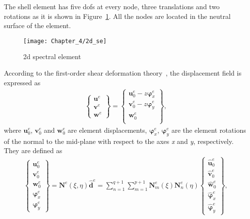 \documentclass[11pt,a4paper,final]{report}
\theoremstyle{plain}
\begin{document}
The shell element has five \acp{dof} at every node, three translations and two rotations as it is shown in Figure~\ref{fig:2d_se}.
All the nodes are located in the neutral surface of the element.
\begin{figure}
	\begin{center}
		\texttt{[image: Chapter\_4/2d\_se]}
	\end{center}
	\caption{\Acl{2d} spectral element}
	\label{fig:2d_se}
\end{figure}
According to the first-order shear deformation theory~\cite{reissner1945effect, mindlin1951influence}, the displacement field is expressed as
\begin{eqnarray}
	\left \{ \begin{array}{c}
		\textbf{u}^e\\
		\textbf{v}^e\\
		\textbf{w}^e
	\end{array} \right\} = 
	\left \{ \begin{array}{c}
		\textbf{u}_0^e - z\boldsymbol{\varphi}_x^e\\
		\textbf{v}_0^e - z\boldsymbol{\varphi}_y^e\\
		\textbf{w}_0^e\\
	\end{array} \right\},
\end{eqnarray}
where \(\textbf{u}_0^e\), \(\textbf{v}_0^e\) and \(\textbf{w}_0^e\) are element displacements, \(\boldsymbol{\varphi}_x^e\), \(\boldsymbol{\varphi}_y^e\) are the element rotations of the normal to the mid-plane with respect to the axes \textit{x} and \textit{y}, respectively. They are defined as
\begin{eqnarray}
	\left \{\begin{array}{c}
		\textbf{u}_0^e\\
		\textbf{v}_0^e\\
		\textbf{w}_0^e\\
		\boldsymbol{\varphi}_x^e\\
		\boldsymbol{\varphi}_y^e
	\end{array} \right\}
	= \textbf{N}^e(\xi,\eta)\widehat{\textbf{d}}^e
	= \sum_{n=1}^{q+1}\sum_{m=1}^{p+1}\textbf{N}_m^e(\xi)\textbf{N}_n^e(\eta)
	\left \{ \begin{array}{c}
		\widehat{\textbf{u}}_0^e \\
		\widehat{\textbf{v}}_0^e \\
		\widehat{\textbf{w}}_0^e \\
		\widehat{\boldsymbol{\varphi}}_x^e \\
		\widehat{\boldsymbol{\varphi}}_y^e
	\end{array} \right \},
\end{eqnarray}
\end{document}
